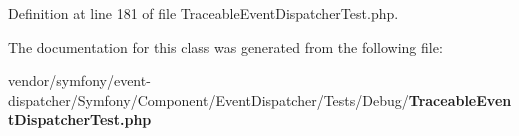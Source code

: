 Definition at line 181 of file Traceable\+Event\+Dispatcher\+Test.\+php.



The documentation for this class was generated from the following file\+:\begin{DoxyCompactItemize}
\item 
vendor/symfony/event-\/dispatcher/\+Symfony/\+Component/\+Event\+Dispatcher/\+Tests/\+Debug/{\bf Traceable\+Event\+Dispatcher\+Test.\+php}\end{DoxyCompactItemize}
